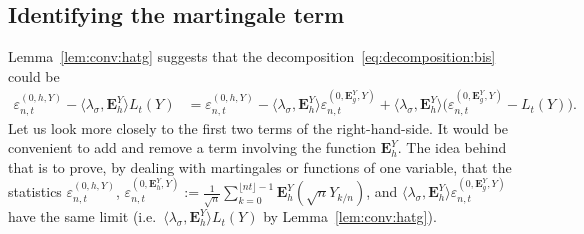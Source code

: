 \documentclass[12pt]{article}
\numberwithin{equation}{section}
\theoremstyle{definition}
\theoremstyle{remark}
\newcommand{\bfH}[1]{\mathbf{E}^Y_{#1}}
\begin{document}
\subsection{Identifying the martingale term} \label{app:decomp:fake}

Lemma~\ref{lem:conv:hatg} suggests that the decomposition~\eqref{eq:decomposition:bis} could be
\begin{align} 
	 \varepsilon_{n,t}^{(0,h,Y)} - \langle \lambda_\sigma , \bfH h \rangle L_t(Y)
	& =		
	 \varepsilon_{n,t}^{(0,h,Y)} - \langle \lambda_\sigma , \bfH h \rangle 
	\varepsilon_{n,t}^{(0,\bfH{g},Y)} %
	+  \langle \lambda_\sigma , \bfH h \rangle \Big(
	\varepsilon_{n,t}^{(0,\bfH{g},Y)} %
	-L_t(Y) \Big).
\end{align}
Let us look more closely to the first two terms of the right-hand-side.
It would be convenient to add and remove a term involving the function $\bfH h$. 
The idea behind that is to prove, by dealing with martingales or functions of one variable, 
that the statistics $ \varepsilon_{n,t}^{(0,h,Y)} $, $ \varepsilon_{n,t}^{(0,\bfH{h},Y)} := \frac1{\sqrt{n}}\sum_{k=0}^{\lfloor n t \rfloor-1} \bfH{h} (\sqrt{n}Y_{k/n})$, 
and  $\langle \lambda_\sigma, \bfH h \rangle \varepsilon_{n,t}^{(0,\bfH{g},Y)}$ 
have the same limit (i.e.~$\langle \lambda_\sigma , \bfH h \rangle L_t(Y)$ by Lemma~\ref{lem:conv:hatg}). 
\end{document}
